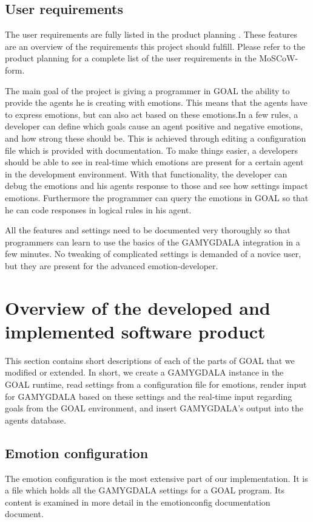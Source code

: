 \documentclass[11pt]{article}
\begin{document}
\subsection{User requirements}
The user requirements are fully listed in the product planning \cite{productplan}. These features are an overview of the requirements this project should fulfill. Please refer to the product planning for a complete list of the user requirements in the \gls{MoSCoW}-form.\cite{MoSCoW}\par
The main goal of the project is giving a programmer in GOAL the ability to provide the agents he is creating with emotions. This means that the agents have to express emotions, but can also act based on these emotions.In a few rules, a developer can define which goals cause an agent positive and negative emotions, and how strong these should be. This is achieved through editing a configuration file which is provided with documentation. To make things easier, a developers should be able to see in real-time which emotions are present for a certain agent in the development environment. With that functionality, the developer can debug the emotions and his agents response to those and see how settings impact emotions. Furthermore the programmer can query the emotions in GOAL so that he can code responses in logical rules in his agent. \par All the features and settings need to be documented very thoroughly so that programmers can learn to use the basics of the GAMYGDALA integration in a few minutes. No tweaking of complicated settings is demanded of a novice user, but they are present for the advanced emotion-developer.


\section{Overview of the developed and implemented software product}
This section contains short descriptions of each of the parts of GOAL that we modified or extended. In short, we create a GAMYGDALA instance in the GOAL runtime, read settings from a configuration file for emotions, render input for GAMYGDALA based on these settings and the real-time input regarding goals from the GOAL environment, and insert GAMYGDALA's output into the agents database.

\subsection{Emotion configuration}
The emotion configuration is the most extensive part of our implementation. It is a file which holds all the GAMYGDALA settings for a GOAL program. Its content is examined in more detail in the emotionconfig documentation document.
\end{document}
